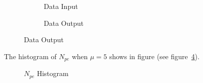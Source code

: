 \begin{figure}[H]
\begin{minipage}[b]{.5\textwidth}
\begin{figure}[H]
    \centering
    \resizebox{\textwidth}{!}{}
    \caption{\label{fig:input} Data Input}
\end{figure}
\end{minipage}
\begin{minipage}[b]{.5\textwidth}
\begin{figure}[H]
    \centering
    \resizebox{\textwidth}{!}{}
    \caption{\label{fig:output} Data Output}
\end{figure}
\end{minipage}
\end{figure}

The histogram of $N_{pe}$ when $\mu=5$ shows in figure (see figure~\ref{fig:penum}). 

\begin{figure}[H]
    \centering
    \scalebox{0.4}{}
    \caption{\label{fig:penum} $N_{pe}$ Histogram}
\end{figure}

